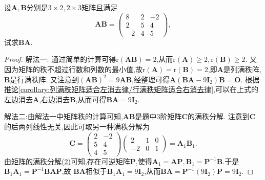 \documentclass[../../main.tex]{subfiles}%
\begin{document}
\begin{example}
设\(\boldsymbol{A},\boldsymbol{B}\)分别是\(3\times2,2\times3\)矩阵且满足
\[
\boldsymbol{A}\boldsymbol{B}=\begin{pmatrix}
8&2&-2\\
2&5&4\\
-2&4&5
\end{pmatrix},
\]
试求\(\boldsymbol{B}\boldsymbol{A}\).
\end{example}
\begin{proof}

{\color{blue}解法一:}
通过简单的计算可得\(\mathrm{r}(\boldsymbol{A}\boldsymbol{B}) = 2\),从而\(\mathrm{r}(\boldsymbol{A})\geqslant 2,\mathrm{r}(\boldsymbol{B})\geqslant 2\). 又因为矩阵的秩不超过行数和列数的最小值,故\(\mathrm{r}(\boldsymbol{A})=\mathrm{r}(\boldsymbol{B}) = 2\),即\(\boldsymbol{A}\)是列满秩阵,\(\boldsymbol{B}\)是行满秩阵. 又注意到\((\boldsymbol{A}\boldsymbol{B})^2 = 9\boldsymbol{A}\boldsymbol{B}\),经整理可得\(\boldsymbol{A}(\boldsymbol{B}\boldsymbol{A}-9\boldsymbol{I}_2)\boldsymbol{B}=\boldsymbol{O}\). 根据\hyperref[corollary:列满秩矩阵适合左消去律/行满秩矩阵适合右消去律]{推论\ref{corollary:列满秩矩阵适合左消去律/行满秩矩阵适合右消去律}},可以在上式的左边消去\(\boldsymbol{A}\),右边消去\(\boldsymbol{B}\),从而可得\(\boldsymbol{B}\boldsymbol{A}=9\boldsymbol{I}_2\).

{\color{blue}解法二:}由{\color{blue}解法一}中矩阵秩的计算可知,\(\boldsymbol{A}\boldsymbol{B}\)是题中\(3\)阶矩阵\(\boldsymbol{C}\)的满秩分解. 注意到\(\boldsymbol{C}\)的后两列线性无关,因此可取另一种满秩分解为
\[
\boldsymbol{C}=\begin{pmatrix}
2&-2\\
5&4\\
4&5
\end{pmatrix}\begin{pmatrix}
2&1&0\\
-2&0&1
\end{pmatrix}=\boldsymbol{A}_1\boldsymbol{B}_1.
\]
由\hyperref[proposition:矩阵的满秩分解]{矩阵的满秩分解(2)}可知,存在可逆矩阵$\boldsymbol{P}$,使得$\boldsymbol{A}_1=\boldsymbol{AP},\boldsymbol{B}_1=\boldsymbol{P}^{-1}\boldsymbol{B}$.于是$\boldsymbol{B}_1\boldsymbol{A}_1=\boldsymbol{P}^{-1}\boldsymbol{BAP}$,故
\(\boldsymbol{B}\boldsymbol{A}\)相似于\(\boldsymbol{B}_1\boldsymbol{A}_1 = 9\boldsymbol{I}_2\),从而\(\boldsymbol{B}\boldsymbol{A}=\boldsymbol{P}^{-1}(9\boldsymbol{I}_2)\boldsymbol{P}=9\boldsymbol{I}_2\). 


\end{proof}
\end{document}
